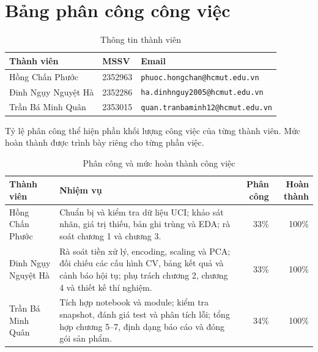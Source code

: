\section{Bảng phân công công việc}
\label{sec:B_1}
\begin{longtable}{p{}p{}p{}}
\caption{Thông tin thành viên}\label{tab:team-members}\\
\toprule
Thành viên & MSSV & Email \\
\midrule
Hồng Chấn Phước & 2352963 & \texttt{phuoc.hongchan@hcmut.edu.vn} \\
Đinh Ngụy Nguyệt Hà & 2352286 & \texttt{ha.dinhnguy2005@hcmut.edu.vn} \\
Trần Bá Minh Quân & 2353015 & \texttt{quan.tranbaminh12@hcmut.edu.vn} \\
\bottomrule
\end{longtable}
Tỷ lệ phân công thể hiện phần khối lượng công việc của từng thành viên. Mức hoàn thành được trình bày riêng cho từng phần việc.
\begin{longtable}{p{}p{}rr}
\caption{Phân công và mức hoàn thành công việc}\label{tab:team-tasks}\\
\toprule
Thành viên & Nhiệm vụ & Phân công & Hoàn thành \\
\midrule
Hồng Chấn Phước & Chuẩn bị và kiểm tra dữ liệu UCI; khảo sát nhãn, giá trị thiếu, bản ghi trùng và EDA; rà soát chương 1 và chương 3. & 33\% & 100\% \\
Đinh Ngụy Nguyệt Hà & Rà soát tiền xử lý, encoding, scaling và PCA; đối chiếu các cấu hình CV, bảng kết quả và cảnh báo hội tụ; phụ trách chương 2, chương 4 và thiết kế thí nghiệm. & 33\% & 100\% \\
Trần Bá Minh Quân & Tích hợp notebook và module; kiểm tra snapshot, đánh giá test và phân tích lỗi; tổng hợp chương 5–7, định dạng báo cáo và đóng gói sản phẩm. & 34\% & 100\% \\
\bottomrule
\end{longtable}
